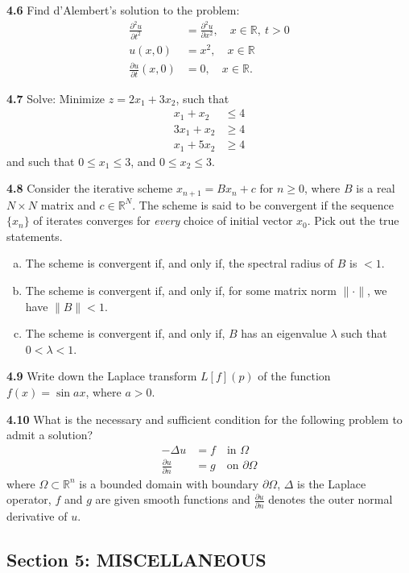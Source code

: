 \documentclass[11pt,a4paper]{article}
\newcommand{\R}{\mathbb{R}}
\newcommand{\examsec}[1]{%
  \subsection*{#1}
  \vspace{-2pt}
}
\newcommand{\qitem}[1]{\par\medskip\noindent\textbf{#1}\hspace{0.5em}}
\begin{document}
\qitem{4.6} Find d'Alembert's solution to the problem:
\begin{align*}
  \frac{\partial^2 u}{\partial t^2} &= \frac{\partial^2 u}{\partial x^2}, \quad x \in \R,\ t > 0 \\
  u(x, 0) &= x^2, \quad x \in \R \\
  \frac{\partial u}{\partial t}(x, 0) &= 0, \quad x \in \R.
\end{align*}

\qitem{4.7} Solve: Minimize $z = 2x_1 + 3x_2$, such that
\begin{align*}
  x_1 + x_2 &\le 4 \\
  3x_1 + x_2 &\ge 4 \\
  x_1 + 5x_2 &\ge 4
\end{align*}
and such that $0 \le x_1 \le 3$, and $0 \le x_2 \le 3$.

\qitem{4.8} Consider the iterative scheme $x_{n+1} = B x_n + c$ for $n \ge 0$, where $B$ is a real $N \times N$ matrix and $c \in \R^N$. The scheme is said to be convergent if the sequence $\{x_n\}$ of iterates converges for \emph{every} choice of initial vector $x_0$. Pick out the true statements.
\begin{enumerate}[a.]
  \item The scheme is convergent if, and only if, the spectral radius of $B$ is $< 1$.
  \item The scheme is convergent if, and only if, for some matrix norm $\|\cdot\|$, we have $\|B\| < 1$.
  \item The scheme is convergent if, and only if, $B$ has an eigenvalue $\lambda$ such that $0 < \lambda < 1$.
\end{enumerate}

\qitem{4.9} Write down the Laplace transform $L[f](p)$ of the function $f(x) = \sin ax$, where $a > 0$.

\qitem{4.10} What is the necessary and sufficient condition for the following problem to admit a solution?
\begin{align*}
  -\Delta u &= f \quad \text{in } \Omega \\
  \frac{\partial u}{\partial n} &= g \quad \text{on } \partial\Omega
\end{align*}
where $\Omega \subset \R^n$ is a bounded domain with boundary $\partial\Omega$, $\Delta$ is the Laplace operator, $f$ and $g$ are given smooth functions and $\frac{\partial u}{\partial n}$ denotes the outer normal derivative of $u$.

\examsec{Section 5: MISCELLANEOUS}
\end{document}
